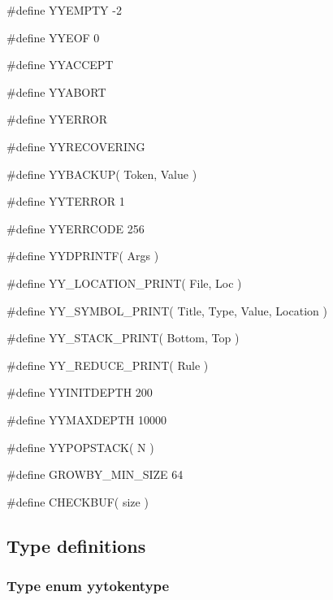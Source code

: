 \medskip
{\stt \#define YYEMPTY -2}

\medskip
{\stt \#define YYEOF 0}

\medskip
{\stt \#define YYACCEPT}

\medskip
{\stt \#define YYABORT}

\medskip
{\stt \#define YYERROR}

\medskip
{\stt \#define YYRECOVERING}

\medskip
{\stt \#define YYBACKUP( Token, Value )}

\medskip
{\stt \#define YYTERROR 1}

\medskip
{\stt \#define YYERRCODE 256}

\medskip
{\stt \#define YYDPRINTF( Args )}

\medskip
{\stt \#define YY\_LOCATION\_PRINT( File, Loc )}

\medskip
{\stt \#define YY\_SYMBOL\_PRINT( Title, Type, Value, Location )}

\medskip
{\stt \#define YY\_STACK\_PRINT( Bottom, Top )}

\medskip
{\stt \#define YY\_REDUCE\_PRINT( Rule )}

\medskip
{\stt \#define YYINITDEPTH 200}

\medskip
{\stt \#define YYMAXDEPTH 10000}

\medskip
{\stt \#define YYPOPSTACK( N )}

\medskip
{\stt \#define GROWBY\_MIN\_SIZE 64}

\medskip
{\stt \#define CHECKBUF( size )}


\subsection{Type definitions}


\subsubsection{Type enum yytokentype}
\label{type_enum_yytokentype_f-exp.c}

